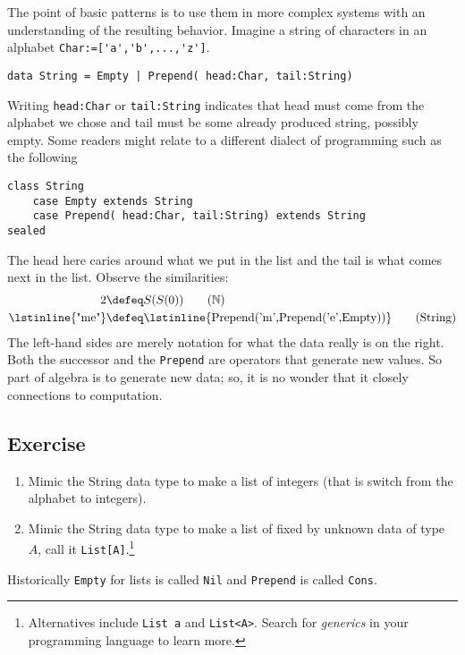 The point of basic patterns is to use them in more complex systems
with an understanding of the resulting behavior.  Imagine a string 
of characters in an alphabet \lstinline{Char:=['a','b',...,'z']}.
\begin{lstlisting}[language=Hidris]
data String = Empty | Prepend( head:Char, tail:String) 
\end{lstlisting}
Writing \lstinline{head:Char} or \lstinline{tail:String} 
indicates that head must come from the alphabet we chose 
and tail must be some already produced string, possibly empty.
Some readers might relate to a different dialect of 
programming such as the following
\begin{lstlisting}[language=Sava]
class String
    case Empty extends String
    case Prepend( head:Char, tail:String) extends String
sealed
\end{lstlisting}
The head here caries around what we put in the list and the tail 
is what comes next in the list.  Observe the similarities:
\begin{align}
     2 & \defeq S(S(0)) \tag{$\mathbb{N}$}\\
 \text{\lstinline{"me"}} & \defeq \text{\lstinline{Prepend('m',Prepend('e',Empty))}}
\tag{String}
\end{align}
The left-hand sides are merely notation for what the data really is on the right.
Both the successor and the \lstinline{Prepend} are operators that generate 
new values.  So part of algebra is to generate new data; so, it is no wonder 
that it closely connections to computation.

\subsection*{Exercise}
\begin{enumerate}
    \item Mimic the String data type to make a list of integers (that is 
    switch from the alphabet to integers).

    \item Mimic the String data type to make a list of fixed by 
    unknown data of type $A$, call it \lstinline{List[A]}.\footnote{
    Alternatives include \lstinline{List a} and \lstinline{List<A>}. 
    Search for \emph{generics} in your programming language to learn more.
    }

\end{enumerate}
Historically \lstinline{Empty} for lists is called \lstinline{Nil} 
and \lstinline{Prepend} is called \lstinline{Cons}.



